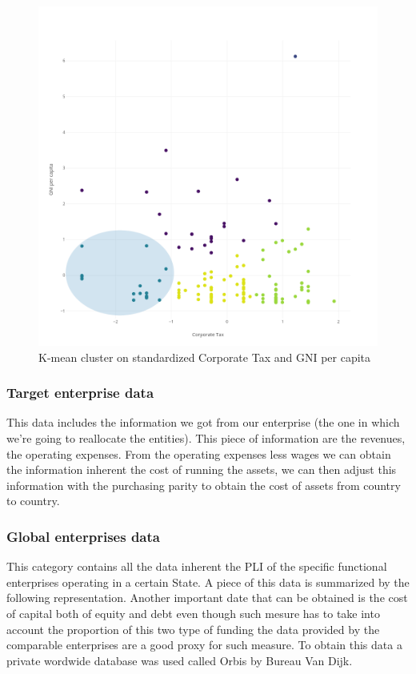 \documentclass{article}
\begin{document}
\begin{figure}[ht]
\centering
\includegraphics[width=0.5\linewidth]{Images/Cluster-GNI-CT.png}
\caption{K-mean cluster on standardized Corporate Tax and GNI per capita}
\end{figure}

\subsubsection{Target enterprise data}
This data includes the information we got from our enterprise (the one in which we're going to reallocate the entities). This piece of information are the revenues, the operating expenses. From the operating expenses less wages we can obtain the information inherent the cost of running the assets\cite{williams_financial_2008}, we can then adjust this information with the purchasing parity to obtain the cost of assets from country to country. 

\subsubsection{Global enterprises data}
This category contains all the data inherent the PLI of the specific functional enterprises operating in a certain State.
A piece of this data is summarized by the following representation. Another important date that can be obtained is the cost of capital both of equity and debt \cite{berman_financial_2013} even though such mesure has to take into account the proportion of this two type of funding the data provided by the comparable enterprises are a good proxy for such measure. To obtain this data a private wordwide database was used called Orbis by Bureau Van Dijk.
\end{document}
